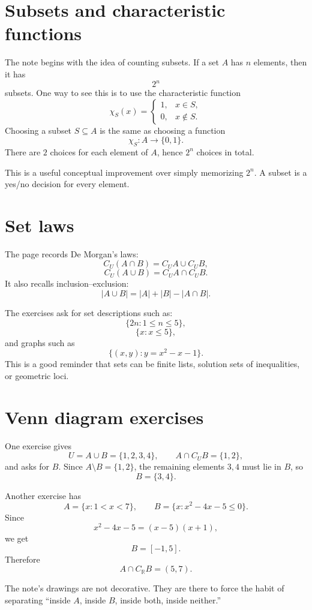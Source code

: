 
\section{Subsets and characteristic functions}

The note begins with the idea of counting subsets.  If a set \(A\) has \(n\) elements, then it has
\[
  2^n
\]
subsets.  One way to see this is to use the characteristic function
\[
  \chi_S(x)=
  \begin{cases}
  1,&x\in S,\\
  0,&x\notin S.
  \end{cases}
\]
Choosing a subset \(S\subseteq A\) is the same as choosing a function
\[
  \chi_S:A\to\{0,1\}.
\]
There are \(2\) choices for each element of \(A\), hence \(2^n\) choices in total.

This is a useful conceptual improvement over simply memorizing \(2^n\).  A subset is a yes/no decision for every element.

\section{Set laws}

The page records De Morgan's laws:
\[
  C_U(A\cap B)=C_UA\cup C_UB,
\]
\[
  C_U(A\cup B)=C_UA\cap C_UB.
\]
It also recalls inclusion--exclusion:
\[
  |A\cup B|=|A|+|B|-|A\cap B|.
\]

The exercises ask for set descriptions such as:
\[
  \{2n:1\le n\le5\},
\]
\[
  \{x:x\le5\},
\]
and graphs such as
\[
  \{(x,y):y=x^2-x-1\}.
\]
This is a good reminder that sets can be finite lists, solution sets of inequalities, or geometric loci.

\section{Venn diagram exercises}

One exercise gives
\[
  U=A\cup B=\{1,2,3,4\},\qquad A\cap C_UB=\{1,2\},
\]
and asks for \(B\).  Since \(A\setminus B=\{1,2\}\), the remaining elements \(3,4\) must lie in \(B\), so
\[
  B=\{3,4\}.
\]

Another exercise has
\[
  A=\{x:1<x<7\},\qquad B=\{x:x^2-4x-5\le0\}.
\]
Since
\[
  x^2-4x-5=(x-5)(x+1),
\]
we get
\[
  B=[-1,5].
\]
Therefore
\[
  A\cap C_{\mathbb R}B=(5,7).
\]

The note's drawings are not decorative.  They are there to force the habit of separating ``inside \(A\), inside \(B\), inside both, inside neither.''

